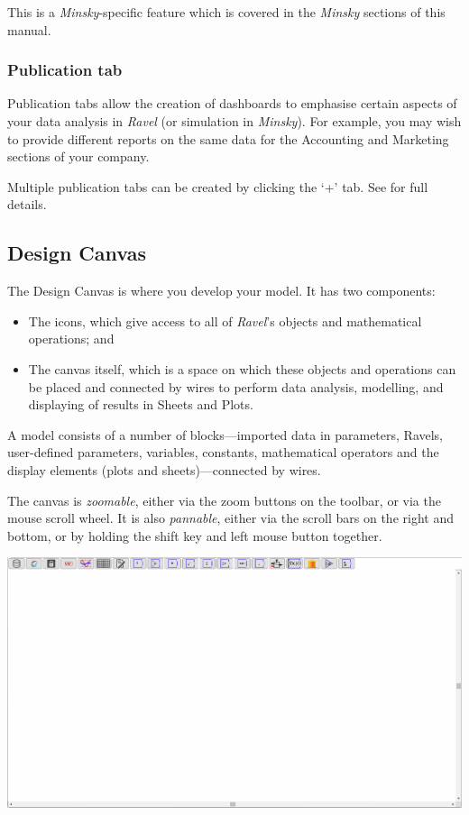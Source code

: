\label{tabs:Phillips}

This is a \emph{Minsky}-specific feature which is covered in the \emph{Minsky
}sections of this manual.

\subsubsection{Publication tab}

Publication tabs allow the creation of dashboards to emphasise certain
aspects of your data analysis in \emph{Ravel }(or simulation in \emph{Minsky}).
For example, you may wish to provide different reports on the same
data for the Accounting and Marketing sections of your company.

Multiple publication tabs can be created by clicking the `+' tab.
See  for full details.

\subsection{Design Canvas}

\label{DesignCanvas}

The Design Canvas is where you develop your model. It has two components:
\begin{itemize}
\item The  icons, which give access to all of
\emph{Ravel}'s objects and mathematical operations; and
\item The canvas itself, which is a space on which these objects and operations
can be placed and connected by wires to perform data analysis, modelling,
and displaying of results in Sheets and Plots.
\end{itemize}
A model consists of a number of blocks---imported data in parameters,
Ravels, user-defined parameters, variables, constants, mathematical
operators and the display elements (plots and sheets)---connected
by wires.

The canvas is \emph{zoomable}, either via the zoom buttons on the
toolbar, or via the mouse scroll wheel. It is also \emph{pannable},
either via the scroll bars on the right and bottom, or by holding
the shift key and left mouse button together. 

\noindent\includegraphics[width=\textwidth]{images/DesignCanvas}


